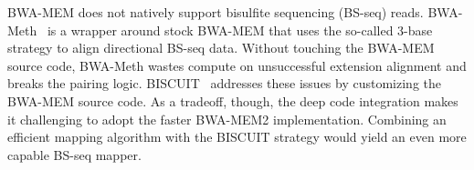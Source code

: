 \documentclass[webpdf,contemporary,large,namedate]{oup-authoring-template}%
\begin{document}
BWA-MEM does not natively support bisulfite sequencing (BS-seq) reads.
BWA-Meth~\citep{Pedersen:2014aa} is a wrapper around stock BWA-MEM that uses the so-called 3-base strategy to align directional BS-seq data.
Without touching the BWA-MEM source code, BWA-Meth wastes compute on unsuccessful extension alignment and breaks the pairing logic.
BISCUIT~\citep{Zhou:2024ac} addresses these issues by customizing the BWA-MEM source code.
As a tradeoff, though, the deep code integration makes it challenging to adopt the faster BWA-MEM2 implementation.
Combining an efficient mapping algorithm with the BISCUIT strategy would yield an even more capable BS-seq mapper.

%
\end{document}
